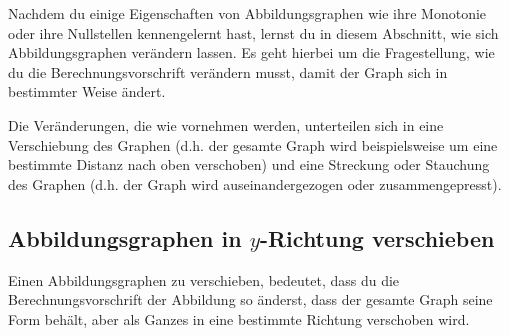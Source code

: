 \documentclass[../../main.tex]{subfiles}
\begin{document}
Nachdem du einige Eigenschaften von Abbildungsgraphen wie ihre Monotonie oder ihre Nullstellen kennengelernt hast, lernst du in diesem Abschnitt, wie sich Abbildungsgraphen verändern lassen. Es geht hierbei um die Fragestellung, wie du die Berechnungsvorschrift verändern musst, damit der Graph sich in bestimmter Weise ändert.

Die Veränderungen, die wie vornehmen werden, unterteilen sich in eine Verschiebung des Graphen (d.h. der gesamte Graph wird beispielsweise um eine bestimmte Distanz nach oben verschoben) und eine Streckung oder Stauchung des Graphen (d.h. der Graph wird auseinandergezogen oder zusammengepresst).

\subsection{Abbildungsgraphen in $y$-Richtung verschieben}
\label{sec:abbildungen_verschieben_y}

Einen Abbildungsgraphen zu verschieben, bedeutet, dass du die Berechnungsvorschrift der Abbildung so änderst, dass der gesamte Graph seine Form behält, aber als Ganzes in eine bestimmte Richtung verschoben wird.
\end{document}
